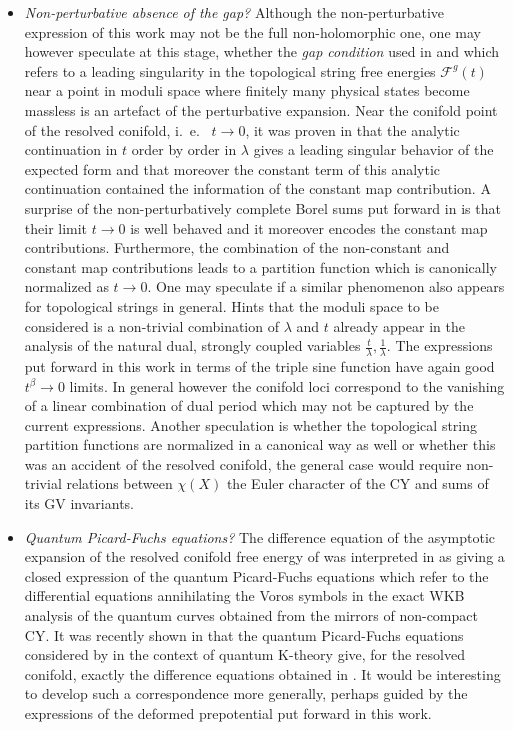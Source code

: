 \documentclass[a4paper,12pt,justification=centering]{article}
\numberwithin{equation}{section}
\theoremstyle{plain}%
\theoremstyle{definition}
\begin{document}
\begin{itemize}
\item \emph{Non-perturbative absence of the gap?}
Although the non-perturbative expression of this work may not be the full non-holomorphic one, one may however speculate at this stage, whether the \emph{gap condition} used in \cite{Huang:2006hq} and which refers to a leading singularity in the topological string free energies $\mathcal{F}^g(t)$ near a point in moduli space where finitely many physical states become massless is an artefact of the perturbative expansion. Near the conifold point of the resolved conifold, i.~e.~ $t\rightarrow 0$, it was proven in \cite{Alim:2021ukq} that the analytic continuation in $t$ order by order in $\lambda$ gives a leading singular behavior of the expected form and that moreover the constant term of this analytic continuation contained the information of the constant map contribution. A surprise of the non-perturbatively complete Borel sums put forward in \cite{Alim:2021mhp} is that their limit $t\rightarrow 0$ is well behaved and it moreover encodes the constant map contributions. Furthermore, the combination of the non-constant and constant map contributions leads to a partition function which is canonically normalized as $t\rightarrow 0$. One may speculate if a similar phenomenon also appears for topological strings in general. Hints that the moduli space to be considered is a non-trivial combination of $\lambda$ and $t$ already appear in the analysis of the natural dual, strongly coupled variables $\frac{t}{\lambda},\frac{1}{\lambda}$. The expressions put forward in this work in terms of the triple sine function have again good $t^{\beta}\rightarrow 0 $ limits. In general however the conifold loci correspond to the vanishing of a linear combination of dual period which may not be captured by the current expressions. Another speculation is whether the topological string partition functions are normalized in a canonical way as well or whether this was an accident of the resolved conifold, the general case would require non-trivial relations between $\chi(X)$ the Euler character of the CY and sums of its GV invariants.



\item \emph{Quantum Picard-Fuchs equations?} The difference equation of the asymptotic expansion of the resolved conifold free energy of \cite{Alim:2020tpw} was interpreted in \cite{Alim:2022oll} as giving a closed expression of the quantum Picard-Fuchs equations which refer to the differential equations annihilating the Voros symbols in the exact WKB analysis of the quantum curves obtained from the mirrors of non-compact CY.  It was recently shown in \cite{Jockers:2024zio} that the quantum Picard-Fuchs equations considered by \cite{Jockers:2019wjh} in the context of quantum K-theory give, for the resolved conifold, exactly the difference equations obtained in \cite{Alim:2020tpw}. It would be interesting to develop such a correspondence more generally, perhaps guided by the expressions of the deformed prepotential put forward in this work.


\end{itemize}
\end{document}
